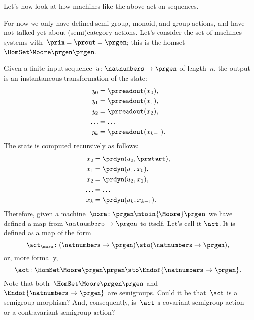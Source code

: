 Let's now look at how machines like the above act on sequences.

For now we only have defined semi-group, monoid, and group actions, and have not talked yet about (semi)category actions.
Let's consider the set of machines systems with~$\prin = \prout = \prgen$; this is the homset~$\HomSet\Moore\prgen\prgen$.

Given a finite input sequence~$u\colon \natnumbers \to \prgen$ of length~$n$, the output is an instantaneous transformation of the state:
%
\begin{equation}
    \label{eq:actions-on-sequences-y}
    \begin{aligned}
        y_0   & = \prreadout(x_0), \\
        y_1   & = \prreadout(x_1), \\
        y_2   & = \prreadout(x_2), \\
        \dots & = \dots \\
        y_{k} & = \prreadout(x_{k-1}).
    \end{aligned}
\end{equation}
%
The state is computed recursively as follows:
\begin{equation}
    \label{eq:actions-on-sequences-x}
    \begin{aligned}
        x_0   & = \prdyn(u_0, \prstart), \\
        x_1   & = \prdyn(u_1, x_0), \\
        x_2   & = \prdyn(u_2, x_1), \\
        \dots & = \dots \\
        x_{k} & = \prdyn(u_{k}, x_{k-1}).
    \end{aligned}
\end{equation}
%
Therefore, given a machine~$\mora \colon \prgen \mtoin{\Moore} \prgen$ we have defined a map from $\natnumbers \to \prgen$ to itself.
Let's call it $\act$.
It is defined as a map of the form
%
\begin{equation}
    \label{eq:actions-on-sequences-1}
    \act_{\mora}\colon  (\natnumbers \to \prgen)  \sto  (\natnumbers \to \prgen),
\end{equation}
%
or, more formally,
%
\begin{equation}
    \label{eq:actions-on-sequences-2}
    \act: \HomSet\Moore\prgen\prgen \sto \Endof {\natnumbers \to \prgen}.
\end{equation}
%
Note that both~$\HomSet\Moore\prgen\prgen$ and $\Endof {\natnumbers \to \prgen}$ are semigroups.
Could it be that~$\act$ is a semigroup morphism?
And, consequently, is~$\act$ a covariant semigroup action or a contravariant semigroup action?

